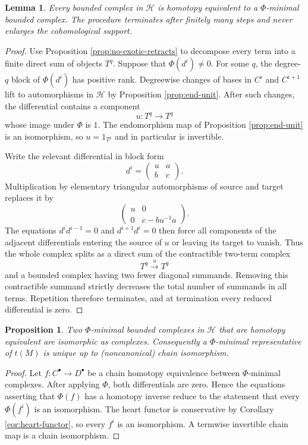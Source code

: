 \documentclass[11pt]{amsart}
\numberwithin{equation}{section}
\newtheorem{proposition}[theorem]{Proposition}
\newtheorem{lemma}[theorem]{Lemma}
\theoremstyle{definition}
\theoremstyle{remark}
\newcommand{\Hh}{\mathcal H}
\begin{document}
\begin{lemma}\label{lem:cancellation}
Every bounded complex in $\Hh$ is homotopy equivalent to a
$\Phi$-minimal bounded complex.  The procedure terminates after finitely many
steps and never enlarges the cohomological support.
\end{lemma}

\begin{proof}
Use Proposition \ref{prop:no-exotic-retracts} to decompose every term into a finite
direct sum of objects $T^q$.  Suppose that $\Phi(d^i)\ne0$.  For some $q$,
the degree-$q$ block of $\Phi(d^i)$ has positive rank.  Degreewise changes of
bases in $C^i$ and $C^{i+1}$ lift to automorphisms in $\Hh$ by Proposition 
\ref{prop:end-unit}.  After such changes, the differential contains a
component
\[
  u\colon T^q\longrightarrow T^q
\]
whose image under $\Phi$ is $1$.  The endomorphism map of Proposition
\ref{prop:end-unit} is an isomorphism, so $u=1_{T^q}$ and in particular is
invertible.

Write the relevant differential in block form
\[
  d^i=
  \begin{pmatrix}
    u & a\\ b & c
  \end{pmatrix}.
\]
Multiplication by elementary triangular automorphisms of source and target
replaces it by
\[
  \begin{pmatrix}
    u & 0\\ 0 & c-bu^{-1}a
  \end{pmatrix}.
\]
The equations $d^id^{i-1}=0$ and $d^{i+1}d^i=0$ then force all components of
the adjacent differentials entering the source of $u$ or leaving its target
to vanish.  Thus the whole complex splits as a direct sum of the contractible
two-term complex
\[
  T^q\xrightarrow{\,u\,}T^q
\]
and a bounded complex having two fewer diagonal summands.  Removing this
contractible summand strictly decreases the total number of summands in all
terms.  Repetition therefore terminates, and at termination every reduced
differential is zero.
\end{proof}

\begin{proposition}
\label{prop:minimal-uniqueness}
Two $\Phi$-minimal bounded complexes in $\Hh$ that are homotopy equivalent
are isomorphic as complexes.  Consequently a $\Phi$-minimal representative
of $t(M)$ is unique up to (noncanonical) chain isomorphism.
\end{proposition}

\begin{proof}
Let $f\colon C^\bullet\to D^\bullet$ be a chain homotopy equivalence between
$\Phi$-minimal complexes.  After applying $\Phi$, both differentials are
zero.  Hence the equations asserting that $\Phi(f)$ has a homotopy inverse
reduce to the statement that every $\Phi(f^i)$ is an isomorphism.  The heart
functor is conservative by Corollary  \ref{cor:heart-functor}, so every $f^i$ is an
isomorphism.  A termwise invertible chain map is a chain isomorphism. 
\end{proof}
\end{document}
